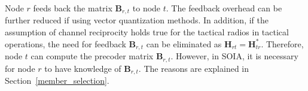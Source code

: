 \documentclass[letterpaper,11pt]{article}
\begin{document}
Node $r$ feeds back the matrix $\mathbf{B}_{r,t}$ to node $t$. The feedback overhead can be further reduced if using vector quantization methods. In addition, if the assumption of channel reciprocity holds true for the tactical radios in tactical operations, the need for feedback $\mathbf{B}_{r,t}$ can be eliminated as $\mathbf{H}_{rt}=\mathbf{H}^{*}_{tr}$. Therefore, node $t$ can compute the precoder matrix $\mathbf{B}_{r,t}$. However, in SOIA, it is necessary for node $r$ to have knowledge of $\mathbf{B}_{r,t}$. The reasons are explained in Section~\ref{member_selection}.






\end{document}
